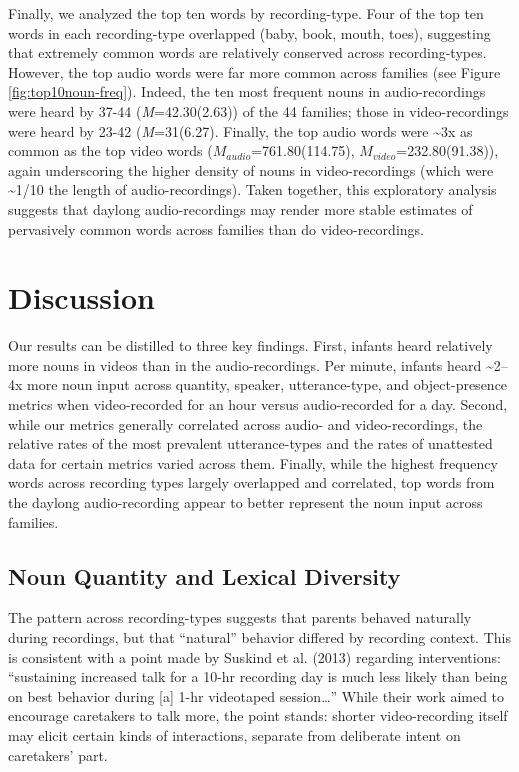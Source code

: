 \documentclass[man]{apa6}
\theoremstyle{definition}
\theoremstyle{definition}
\theoremstyle{definition}
\theoremstyle{remark}
\begin{document}
Finally, we analyzed the top ten words by recording-type. Four of the
top ten words in each recording-type overlapped (baby, book, mouth,
toes), suggesting that extremely common words are relatively conserved
across recording-types. However, the top audio words were far more
common across families (see Figure \ref{fig:top10noun-freq}). Indeed,
the ten most frequent nouns in audio-recordings were heard by 37-44
(\emph{M}=42.30(2.63)) of the 44 families; those in video-recordings
were heard by 23-42 (\emph{M}=31(6.27). Finally, the top audio words
were \textasciitilde{}3x as common as the top video words
(\(M_{audio}\)=761.80(114.75), \(M_{video}\)=232.80(91.38)), again
underscoring the higher density of nouns in video-recordings (which were
\textasciitilde{}1/10 the length of audio-recordings). Taken together,
this exploratory analysis suggests that daylong audio-recordings may
render more stable estimates of pervasively common words across families
than do video-recordings.

\section{Discussion}\label{discussion}

Our results can be distilled to three key findings. First, infants heard
relatively more nouns in videos than in the audio-recordings. Per
minute, infants heard \textasciitilde{}2--4x more noun input across
quantity, speaker, utterance-type, and object-presence metrics when
video-recorded for an hour versus audio-recorded for a day. Second,
while our metrics generally correlated across audio- and
video-recordings, the relative rates of the most prevalent
utterance-types and the rates of unattested data for certain metrics
varied across them. Finally, while the highest frequency words across
recording types largely overlapped and correlated, top words from the
daylong audio-recording appear to better represent the noun input across
families.

\subsection{Noun Quantity and Lexical
Diversity}\label{noun-quantity-and-lexical-diversity}

The pattern across recording-types suggests that parents behaved
naturally during recordings, but that \enquote{natural} behavior
differed by recording context. This is consistent with a point made by
Suskind et al. (2013) regarding interventions: \enquote{sustaining
increased talk for a 10-hr recording day is much less likely than being
on best behavior during {[}a{]} 1-hr videotaped session\ldots{}} While
their work aimed to encourage caretakers to talk more, the point stands:
shorter video-recording itself may elicit certain kinds of interactions,
separate from deliberate intent on caretakers' part.
\end{document}
